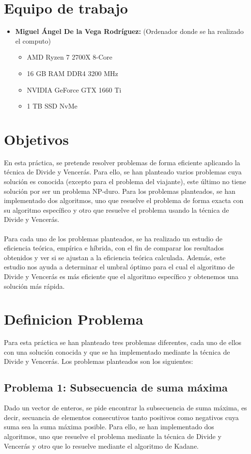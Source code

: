 \documentclass[11pt,openany]{book}
\begin{document}
\chapter{Equipo de trabajo}

\begin{itemize}
      \item \textbf{Miguel Ángel De la Vega Rodríguez:} (Ordenador donde se ha realizado el computo)
            \begin{itemize}
                  \item AMD Ryzen 7 2700X 8-Core
                  \item 16 GB RAM DDR4 3200 MHz
                  \item NVIDIA GeForce GTX 1660 Ti
                  \item 1 TB SSD NvMe
            \end{itemize}
\end{itemize}

\chapter{Objetivos}
En esta práctica, se pretende resolver problemas de forma eficiente aplicando la técnica de
Divide y Vencerás. Para ello, se han planteado varios problemas cuya solución es conocida
(excepto para el problema del viajante), este último no tiene solución por ser un problema
NP-duro. Para los problemas planteados, se han implementado dos algoritmos, uno que resuelve
el problema de forma exacta con su algoritmo específico y otro que resuelve el problema usando
la técnica de Divide y Vencerás. \\ \\ Para cada uno de los problemas planteados, se ha realizado un
estudio de eficiencia teórica, empírica e híbrida, con el fin de comparar los resultados obtenidos
y ver si se ajustan a la eficiencia teórica calculada. Además, este estudio nos ayuda a
determinar el umbral óptimo para el cual el algoritmo de Divide y Vencerás es más eficiente que
el algoritmo específico y obtenemos una solución más rápida.
\chapter{Definicion Problema}
Para esta práctica se han planteado tres problemas diferentes, cada uno de ellos con una solución conocida
y que se ha implementado mediante la técnica de Divide y Vencerás. Los problemas planteados son los siguientes:
\section{Problema 1: Subsecuencia de suma máxima}
Dado un vector de enteros, se pide encontrar la subsecuencia de suma máxima, es decir, secuancia de elementos consecutivos
tanto positivos como negativos cuya suma sea la suma máxima posible. Para ello, se han implementado dos algoritmos, uno
que resuelve el problema mediante la técnica de Divide y Vencerás y otro que lo resuelve mediante el algoritmo de Kadane.
\end{document}
